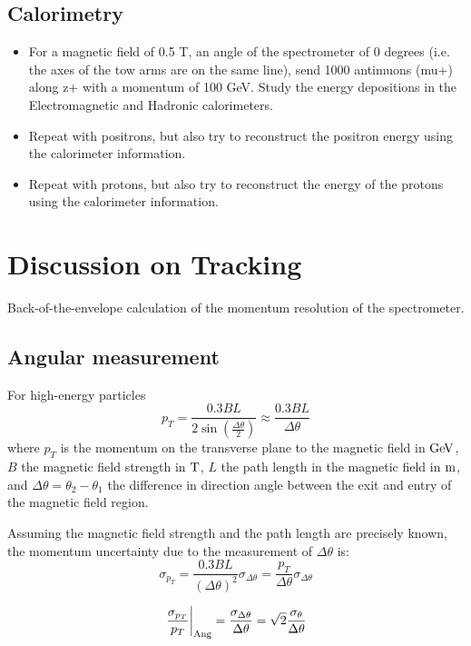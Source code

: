 \documentclass[a4paper,11pt,twoside]{article}
\begin{document}
\subsection{Calorimetry}
\begin{itemize}
    \item For a magnetic field of 0.5 T, an angle of the spectrometer of 0 degrees (i.e. the axes of the tow arms are on the same line), send 1000 antimuons (mu+) along z+ with a momentum of 100 GeV. Study the energy depositions in the Electromagnetic and Hadronic calorimeters. 
\item Repeat with positrons, but also try to reconstruct the positron energy using the calorimeter information.
\item Repeat with protons, but also try to reconstruct the energy of the protons using the calorimeter information.
\end{itemize}


\section{Discussion on Tracking}
Back-of-the-envelope calculation of the momentum resolution of the spectrometer.

\subsection{Angular measurement}

For high-energy particles
\begin{equation}
  p_T =\frac{0.3BL}{2\sin\left(\frac{\Delta\theta}{2}\right)}\approx \frac{0.3BL}{\Delta\theta}
\end{equation}
where $p_T$ is the momentum on the transverse plane to the magnetic
field in ${\rm GeV}$, $B$ the magnetic field strength in ${\rm T}$,
$L$ the path length in the magnetic field in ${\rm m}$, and
$\Delta\theta=\theta_{2}-\theta_{1}$ the difference in direction angle
between the exit and entry of the magnetic field region.

Assuming the magnetic field strength and the path length are precisely known,
the momentum uncertainty due to the measurement of $\Delta\theta$ is:
\begin{equation}
  \sigma_{p_T} = \frac{0.3BL}{\left(\Delta\theta\right)^2}\sigma_{\Delta\theta} =
    \frac{p_T}{\Delta\theta}\sigma_{\Delta\theta}
\end{equation}

\begin{equation}
  \left.\frac{\sigma_{p_T}}{p_T}\right|_{\rm Ang}= \frac{\sigma_{\Delta\theta}}{\Delta\theta} =\sqrt{2}\frac{\sigma_\theta}{\Delta\theta}
\end{equation}
\end{document}
